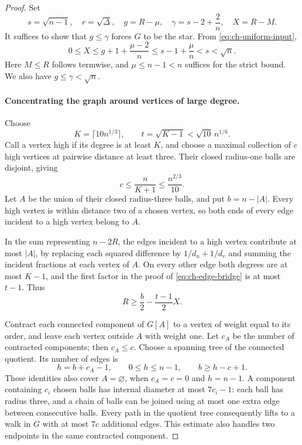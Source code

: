 \documentclass[11pt,a4paper]{article}
\theoremstyle{definition}
\theoremstyle{remark}
\numberwithin{equation}{section}
\begin{document}
\begin{proof}
Set
\[
 s=\sqrt{n-1},\quad r=\sqrt\Delta,\quad
 g=R-\mu,\quad \gamma=s-2+\frac2n,\quad X=R-M.
\]
It suffices to show that $g\le\gamma$ forces $G$ to be the star.
From \eqref{eq:ch-uniform-input},
\begin{equation}\label{eq:ch-X-bound}
 0\le X\le g+1+\frac{\mu-2}{n}
             \le s-1+\frac\mu n<s<\sqrt n.
\end{equation}
Here $M\le R$ follows termwise, and $\mu\le n-1<n$ suffices for the
strict bound. We also have $g\le\gamma<\sqrt n$.

\paragraph{Concentrating the graph around vertices of large degree.}
Choose
\[
 K=\lceil10n^{1/3}\rceil,\qquad t=\sqrt{K-1}<\sqrt{10}\,n^{1/6}.
\]
Call a vertex high if its degree is at least $K$, and choose a maximal
collection of $c$ high vertices at pairwise distance at least three. Their
closed radius-one balls are disjoint, giving
\begin{equation}\label{eq:ch-c-bound}
 c\le\frac n{K+1}\le\frac{n^{2/3}}{10}.
\end{equation}
Let $A$ be the union of their closed radius-three balls, and put
$b=n-|A|$. Every high vertex is within distance two of a chosen vertex,
so both ends of every edge incident to a high vertex belong to $A$.

In the sum representing $n-2R$, the edges incident to a high vertex
contribute at most $|A|$, by replacing each squared difference by
$1/d_u+1/d_v$ and summing the incident fractions at each vertex of $A$.
On every other edge both degrees are at most $K-1$, and the first factor
in the proof of \eqref{eq:ch-edge-bridge} is at most $t-1$. Thus
\begin{equation}\label{eq:ch-R-split}
 R\ge\frac b2-\frac{t-1}{2}X.
\end{equation}

Contract each connected component of $G[A]$ to a vertex of weight equal
to its order, and leave each vertex outside $A$ with weight one. Let
$c_A$ be the number of contracted components; then $c_A\le c$. Choose a
spanning tree of the connected quotient. Its number of edges is
\[
 h=b+c_A-1,\qquad 0\le h\le n-1,
 \qquad b\ge h-c+1.
\]
These identities also cover $A=\varnothing$, when $c_A=c=0$ and $h=n-1$.
A component containing $c_i$ chosen balls has internal diameter at most
$7c_i-1$: each ball has radius three, and a chain of balls can be joined
using at most one extra edge between consecutive balls. Every path in the
quotient tree consequently lifts to a walk in $G$ with at most $7c$
additional edges. This estimate also handles two endpoints in the same
contracted component.


\end{proof}
\end{document}
